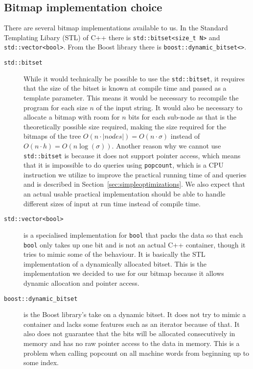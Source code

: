 \subsection{Bitmap implementation choice}
There are several bitmap implementations available to us. In the Standard Templating Libary (STL) of C++ there is \texttt{std::bitset<size\_t N>} and \texttt{std::vector<bool>}. From the Boost library there is \texttt{boost::dynamic\_bitset<>}.
\begin{description}
\item[\texttt{std::bitset}] While it would technically be possible to use the \texttt{std::bitset}, it requires that the size of the bitset is known at compile time and passed as a template parameter. This means it would be necessary to recompile the program for each size $n$ of the input string. 
It would also be necessary to allocate a bitmap with room for $n$ bits for each sub-node as that is the theoretically possible size required, making the size required for the bitmaps of the tree $O(n \cdot |nodes|) = O(n \cdot \sigma)$ instead of $O(n \cdot h) = O(n\log(\sigma))$.
Another reason why we cannot use \texttt{std::bitset} is because it does not support pointer access, which means that it is impossible to do queries using \texttt{popcount}, which is a CPU instruction we utilize to improve the practical running time of  and  queries and is described in Section~\ref{sec:simpleoptimizations}.
We also expect that an actual usable practical implementation should be able to handle different sizes of input at run time instead of compile time. 

\item[\texttt{std::vector<bool>}] is a specialised implementation for \texttt{bool} that packs the data so that each \texttt{bool} only takes up one bit and is not an actual C++ container, though it tries to mimic some of the behaviour. 
It is basically the STL implementation of a dynamically allocated bitset. This is the implementation we decided to use for our bitmap because it allows dynamic allocation and pointer access.

\item[\texttt{boost::dynamic\_bitset}] is the Boost library's take on a dynamic bitset. 
It does not try to mimic a container and lacks some features such as an iterator because of that. 
It also does not guarantee that the bits will be allocated consecutively in memory and has no raw pointer access to the data in memory. 
This is a problem when calling popcount on all machine words from beginning up to some index.
\end{description}

